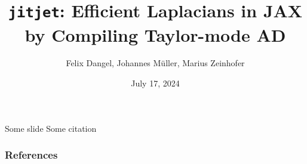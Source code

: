 \documentclass[12pt,usepdftitle=false,aspectratio=169]{beamer}
\title{%
  \texttt{jitjet}: Efficient Laplacians in JAX by Compiling Taylor-mode AD
}
\author{Felix Dangel, Johannes M\"uller, Marius Zeinhofer}
\date{July 17, 2024}
\begin{document}
\makeTitleSlide

\begin{frame}{Some slide}
  Some citation \cite{li2023forward}
\end{frame}

\begin{frame}[allowframebreaks]
  \frametitle{References}

  {\footnotesize
    
    
  }
\end{frame}
\end{document}
